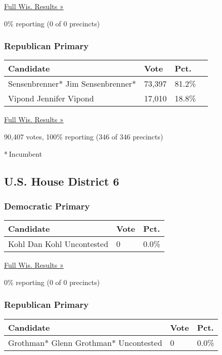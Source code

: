 \href{https://www.nytimes3xbfgragh.onion/elections/results/wisconsin}{Full
Wis. Results »}

0\% reporting (0 of 0 precincts)

\hypertarget{republican-primary-5}{%
\subsubsection{Republican Primary}\label{republican-primary-5}}

\begin{longtable}[]{@{}llll@{}}
\toprule
Candidate & Vote & Pct. &\tabularnewline
\midrule
\endhead
 Sensenbrenner* Jim Sensenbrenner* & 73,397 & 81.2\% &\tabularnewline
 Vipond Jennifer Vipond & 17,010 & 18.8\% &\tabularnewline
\bottomrule
\end{longtable}

\href{https://www.nytimes3xbfgragh.onion/elections/results/wisconsin}{Full
Wis. Results »}

90,407 votes, 100\% reporting (346 of 346 precincts)

* Incumbent

\hypertarget{us-house-district-6}{%
\subsection{U.S. House District 6}\label{us-house-district-6}}

\hypertarget{democratic-primary-7}{%
\subsubsection{Democratic Primary}\label{democratic-primary-7}}

\begin{longtable}[]{@{}lll@{}}
\toprule
Candidate & Vote & Pct.\tabularnewline
\midrule
\endhead
 Kohl Dan Kohl Uncontested & 0 & 0.0\%\tabularnewline
\bottomrule
\end{longtable}

\href{https://www.nytimes3xbfgragh.onion/elections/results/wisconsin}{Full
Wis. Results »}

0\% reporting (0 of 0 precincts)

\hypertarget{republican-primary-6}{%
\subsubsection{Republican Primary}\label{republican-primary-6}}

\begin{longtable}[]{@{}lll@{}}
\toprule
Candidate & Vote & Pct.\tabularnewline
\midrule
\endhead
 Grothman* Glenn Grothman* Uncontested & 0 & 0.0\%\tabularnewline
\bottomrule
\end{longtable}

